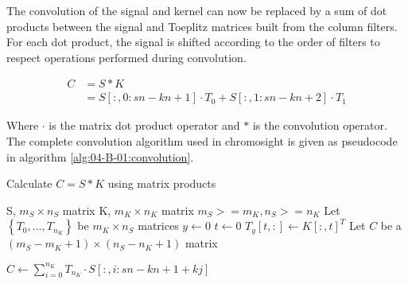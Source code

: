 The convolution of the signal and kernel can now be replaced by a sum of dot products between the signal and Toeplitz matrices built from the column filters. For each dot product, the signal is shifted according to the order of filters to respect operations performed during convolution.

\begin{align}
    C &= S * K \\
      &= S[:, 0: sn-kn+1] \cdot T_0 + S[:, 1:sn-kn+2] \cdot T_1
\end{align}

Where $\cdot$ is the matrix dot product operator and $*$ is the convolution operator.
The complete convolution algorithm used in chromosight is given as pseudocode in algorithm \ref{alg:04-B-01:convolution}.

\begin{algorithm}
\caption{Calculate $C = S * K$ using matrix products}
\label{alg:04-B-01:convolution}
\begin{algorithmic}
\REQUIRE S, $m_S \times n_S$ matrix
\REQUIRE K, $m_K \times n_K$ matrix
\ENSURE $m_S >= m_K, n_S >= n_K$
\STATE Let $\left\{T_0, ..., T_{n_K}\right\}$ be $m_K \times n_S$ matrices
\STATE $y \leftarrow 0$
    \STATE $t \leftarrow 0$
        \STATE $T_y[t, :] \leftarrow K[:, t]^T$
    \ENDWHILE
\ENDWHILE
\STATE Let $C$ be a $(m_S - m_K + 1) \times (n_S - n_K + 1)$ matrix

\STATE $C \leftarrow \sum_{i=0}^{n_K}{T_{n_K} \cdot S[: , i: sn-kn+1+kj]}$ 
\end{algorithmic}
\end{algorithm}